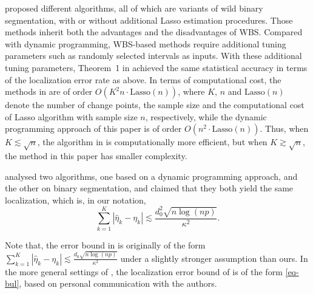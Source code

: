\documentclass[twoside]{article}
\begin{document}
\cite{wang2019statistically} proposed different algorithms, all of which are variants of wild binary segmentation, with or without additional Lasso estimation procedures.  Those methods inherit both the advantages and the disadvantages of WBS.  Compared with dynamic programming, WBS-based methods require additional tuning parameters such as randomly selected intervals as inputs.  With these additional tuning parameters, Theorem~1 in \cite{wang2019statistically} achieved the same statistical accuracy in terms of the localization error rate as    above. 
		In terms of computational cost, the methods in \cite{wang2019statistically} are of order $O(K^2 n\cdot \text{Lasso}(n))$, where $K$, $n$ and $\text{Lasso}(n)$ denote the number of change points, the sample size and the computational cost of Lasso algorithm with sample size $n$, respectively, while the dynamic programming approach of this paper   is of order $O(n^2 \cdot \text{Lasso}(n))$.  Thus, when $K \lesssim \sqrt{n}$, the algorithm in \cite{wang2019statistically} is computationally more efficient, but when $K \gtrsim \sqrt{n}$, the method in this paper has smaller complexity.

\cite{leonardi2016computationally} analysed two algorithms, one based on a dynamic programming approach, and the other on binary segmentation, and claimed that they both yield the same localization, which is, in our notation,
		\begin{equation}\label{eq-bul}
			\sum_{k = 1}^K |\hat{\eta}_k - \eta_k| \lesssim \frac{d_0^2 \sqrt{n \log(np)}}{\kappa^2}.
		\end{equation}

Note that, the error bound  in \cite{leonardi2016computationally}   is originally of the form  $	\sum_{k = 1}^K |\hat{\eta}_k - \eta_k| \lesssim \frac{d_0 \sqrt{n \log(np)}}{\kappa^2}$ under a slightly stronger assumption than ours.  In the more general settings of ,  the localization error bound  of    \cite{leonardi2016computationally} is of the form \eqref{eq-bul}, based on personal communication with the authors.  
		
\end{document}
